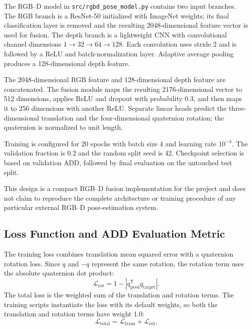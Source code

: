 \documentclass[11pt,a4paper]{article}
\begin{document}
The RGB--D model in \texttt{src/rgbd\_pose\_model.py} contains two input
branches. The RGB branch is a ResNet-50 initialized with ImageNet weights; its
final classification layer is removed and the resulting 2048-dimensional
feature vector is used for fusion. The depth branch is a lightweight CNN with
convolutional channel dimensions $1\rightarrow32\rightarrow64\rightarrow128$.
Each convolution uses stride 2 and is followed by a ReLU and batch-normalization
layer. Adaptive average pooling produces a 128-dimensional depth feature.

The 2048-dimensional RGB feature and 128-dimensional depth feature are
concatenated. The fusion module maps the resulting 2176-dimensional vector to
512 dimensions, applies ReLU and dropout with probability 0.3, and then maps
it to 256 dimensions with another ReLU. Separate linear heads predict the
three-dimensional translation and the four-dimensional quaternion rotation;
the quaternion is normalized to unit length.

Training is configured for 20 epochs with batch size 4 and learning rate
$10^{-4}$. The validation fraction is 0.2 and the random split seed is 42.
Checkpoint selection is based on validation ADD, followed by final evaluation
on the untouched test split.

This design is a compact RGB--D fusion implementation for the project and does
not claim to reproduce the complete architecture or training procedure of any
particular external RGB--D pose-estimation system.

\subsection{Loss Function and ADD Evaluation Metric}

The training loss combines translation mean squared error with a quaternion
rotation loss. Since $q$ and $-q$ represent the same rotation, the rotation
term uses the absolute quaternion dot product:
\begin{equation}
    \mathcal{L}_{\mathrm{rot}}
    = 1 - \left|q_{\mathrm{pred}}^{\mathsf{T}}q_{\mathrm{target}}\right|.
\end{equation}
The total loss is the weighted sum of the translation and rotation terms. The
training scripts instantiate the loss with its default weights, so both the
translation and rotation terms have weight 1.0:
\begin{equation}
    \mathcal{L}_{\mathrm{total}}
    = \mathcal{L}_{\mathrm{trans}} + \mathcal{L}_{\mathrm{rot}}.
\end{equation}
\end{document}
